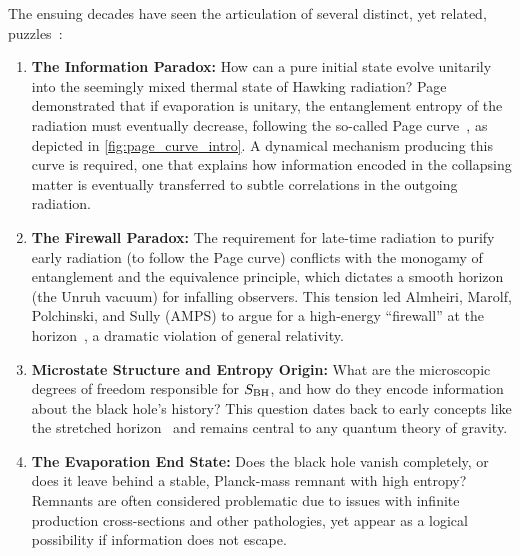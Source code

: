\documentclass[11pt,a4paper]{article}
\theoremstyle{plain}
\theoremstyle{definition}
\theoremstyle{remark}
\begin{document}
The ensuing decades have seen the articulation of several distinct, yet related, puzzles~\cite{Mathur:2009, Harlow:2016}:
\begin{enumerate}
    \item \textbf{The Information Paradox:} How can a pure initial state evolve unitarily into the seemingly mixed thermal state of Hawking radiation? Page demonstrated that if evaporation is unitary, the entanglement entropy of the radiation must eventually decrease, following the so-called Page curve~\cite{Page:1993}, as depicted in \cref{fig:page_curve_intro}. A dynamical mechanism producing this curve is required, one that explains how information encoded in the collapsing matter is eventually transferred to subtle correlations in the outgoing radiation.
    \item \textbf{The Firewall Paradox:} The requirement for late-time radiation to purify early radiation (to follow the Page curve) conflicts with the monogamy of entanglement and the equivalence principle, which dictates a smooth horizon (the Unruh vacuum) for infalling observers. This tension led Almheiri, Marolf, Polchinski, and Sully (AMPS) to argue for a high-energy ``firewall'' at the horizon~\cite{AMPS:2013}, a dramatic violation of general relativity.
    \item \textbf{Microstate Structure and Entropy Origin:} What are the microscopic degrees of freedom responsible for $S_{\rm BH}$, and how do they encode information about the black hole's history? This question dates back to early concepts like the stretched horizon~\cite{Susskind:1993} and remains central to any quantum theory of gravity.
    \item \textbf{The Evaporation End State:} Does the black hole vanish completely, or does it leave behind a stable, Planck-mass remnant with high entropy? Remnants are often considered problematic due to issues with infinite production cross-sections and other pathologies, yet appear as a logical possibility if information does not escape.
\end{enumerate}
\end{document}
